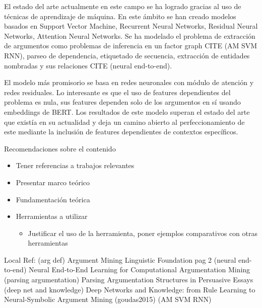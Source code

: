 El estado del arte actualmente en este campo se ha logrado gracias al uso de técnicas de aprendizaje de
máquina. En este ámbito se han creado modelos basados en Support Vector Machine, Recurrent Neural Networks, 
Residual Neural Networks, Attention Neural Networks. Se ha modelado el problema de extracción de argumentos
como problemas de inferencia en un factor graph CITE (AM SVM RNN), parseo de dependencia, etiquetado de
secuencia, extracción de entidades nombradas y sus relaciones CITE (neural end-to-end).

El modelo más promisorio se basa en redes neuronales con módulo de atención y redes residuales. Lo interesante
es que el uso de features dependientes del problema es nula, sus features dependen solo de los argumentos en sí
usando embeddings de BERT. Los resultados de este modelo superan el estado del arte que existía en su actualidad
y deja un camino abierto al perfeccionamiento de este mediante la inclusión de features dependientes de contextos
específicos.

Recomendaciones sobre el contenido
\begin{itemize}
    \item Tener referencias a trabajos relevantes
    \item Presentar marco teórico
    \item Fundamentación teórica
    \item Herramientas a utilizar
    \begin{itemize}
        \item Justificar el uso de la herramienta, poner ejemplos comparativos con otras herramientas
    \end{itemize}
\end{itemize}

Local Ref:
(arg def) Argument Mining Linguistic Foundation pag 2
(neural end-to-end) Neural End-to-End Learning for Computational Argumentation Mining
(parsing argumentation) Parsing Argumentation Structures in Persuasive Essays
(deep net and knowledge) Deep Networks and Knowledge: from Rule Learning to Neural-Symbolic Argument Mining
(goudas2015)
(AM SVM RNN)